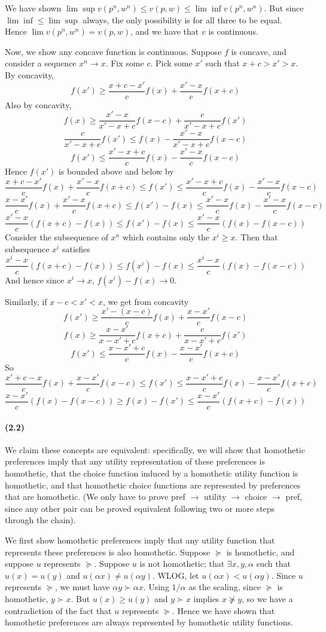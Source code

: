\documentclass[10pt,letter]{article}
\begin{document}
We have shown $\lim \sup v(p^n, w^n) \le v(p,w) \le \lim \inf v(p^n, w^n)$. But since $\lim \inf \le \lim \sup$ always, the only possibility is for all three to be equal. Hence $\lim v(p^n, w^n) = v(p,w)$, and we have that $v$ is continuous.

Now, we show any concave function is continuous. Suppose $f$ is concave, and consider a sequence $x^n \to x$. Fix some $c$. Pick some $x'$ such that $x+c > x' > x$. By concavity,
\[ f(x') \ge \frac{x + c -x'}{c}f(x) + \frac{x'-x}{c}f(x + c)  \]
Also by concavity,
\[ f(x) \ge \frac{x'-x}{x'-x+c}f(x-c) + \frac{c}{x'-x+c}f(x') \]
\[ \frac{c}{x'-x+c}f(x') \le f(x) - \frac{x'-x}{x'-x+c}f(x-c) \]
\[ f(x') \le \frac{x'-x+c}{c}f(x) - \frac{x'-x}{c}f(x-c) \]
Hence $f(x')$ is bounded above and below by
\[ \frac{x + c -x'}{c}f(x) + \frac{x'-x}{c}f(x + c) \le f(x') \le \frac{x'-x+c}{c}f(x) - \frac{x'-x}{c}f(x-c)\]
\[ \frac{x -x'}{c}f(x) + \frac{x'-x}{c}f(x + c) \le f(x') - f(x) \le \frac{x'-x}{c}f(x) - \frac{x'-x}{c}f(x-c)\]
\[ \frac{x'-x}{c}(f(x+c) - f(x)) \le f(x') - f(x) \le \frac{x'-x}{c}(f(x) - f(x-c)) \]
Consider the subsequence of $x^n$ which contains only the $x^i \ge x$. Then that subsequence $x^i$ satisfies
\[ \frac{x^i-x}{c}(f(x+c) - f(x)) \le f(x^i) - f(x) \le \frac{x^i-x}{c}(f(x) - f(x-c)) \]
And hence since $x^i \to x$, $f(x^i) - f(x) \to 0$.

Similarly, if $x-c < x' < x$, we get from concavity
\[ f(x') \ge \frac{x' - (x- c)}{c}f(x) + \frac{x-x'}{c}f(x - c)  \]
\[ f(x) \ge \frac{x-x'}{x-x'+c}f(x+c) + \frac{c}{x-x'+c}f(x') \]
\[ f(x') \le \frac{x-x'+c}{c}f(x) - \frac{x-x'}{c}f(x+c) \]
So
\[ \frac{x' + c - x}{c}f(x) + \frac{x-x'}{c}f(x - c) \le f(x') \le \frac{x-x'+c}{c}f(x) - \frac{x-x'}{c}f(x+c) \]
\[ \frac{x-x'}{c}(f(x) - f(x - c) ) \ge f(x) - f(x') \le \frac{x-x'}{c}(f(x+c) - f(x)) \]

\paragraph{(2.2)}
We claim these concepts are equivalent: specifically, we will show that homothetic preferences imply that any utility representation of these preferences is homothetic, that the choice function induced by a homothetic utility function is homothetic, and that homothetic choice functions are represented by preferences that are homothetic. (We only have to prove pref $\to$ utility $\to$ choice $\to$ pref, since any other pair can be proved equivalent following two or more steps through the chain).

We first show homothetic preferences imply that any utility function that represents these preferences is also homothetic. Suppose $\succeq$ is homothetic, and suppose $u$ represents $\succeq$. Suppose $u$ is not homothetic; that $\exists x, y, \alpha$ such that $u(x) = u(y)$ and $u(\alpha x) \neq u(\alpha y)$. WLOG, let  $u(\alpha x) < u(\alpha y)$. Since $u$ represents $\succeq$, we must have $\alpha y \succ \alpha x$. Using $1/\alpha$ as the scaling, since $\succeq$ is homothetic, $ y \succ x$. But $u(x) \ge u(y)$ and $y \succ x$ implies $x \not \succeq y$, so we have a contradiction of the fact that $u$ represents $\succeq$. Hence we have shown that homothetic preferences are always represented by homothetic utility functions.
\end{document}
